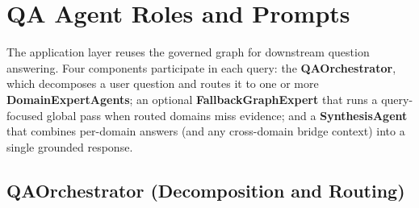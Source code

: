 \documentclass{article}
\begin{document}
\setcounter{section}{4}
\section{QA Agent Roles and Prompts}
\label{app:qa_agents}

The application layer reuses the governed graph for downstream
question answering. Four components participate in each query:
the \textbf{QAOrchestrator}, which decomposes a user question and
routes it to one or more \textbf{DomainExpertAgents}; an optional
\textbf{FallbackGraphExpert} that runs a query-focused global pass when
routed domains miss evidence; and a \textbf{SynthesisAgent} that
combines per-domain answers (and any cross-domain bridge context)
into a single grounded response.

\newpage
\subsection{QAOrchestrator (Decomposition and Routing)}
\label{app:qa_orchestrator}
\end{document}
